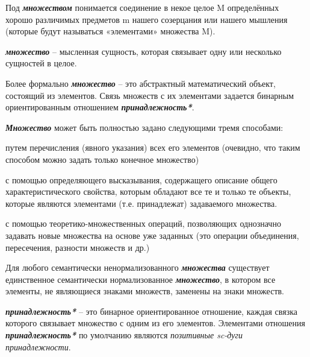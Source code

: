 Под \textbf{\textit{множеством}} понимается соединение в некое целое M определённых хорошо различимых предметов m нашего созерцания или нашего мышления (которые будут называться «элементами» множества M). 
	
\textbf{\textit{множество}} – мысленная сущность, которая связывает одну или несколько сущностей в целое.
	
Более формально \textbf{\textit{множество}} – это абстрактный математический объект, состоящий из элементов. Связь множеств с их элементами задается бинарным ориентированным отношением \textbf{\textit{принадлежность*}}.

\textbf{\textit{Множество}} может быть полностью задано следующими тремя способами:

\begin{textitemize}
		\item путем перечисления (явного указания) всех его элементов (очевидно, что таким способом можно задать только конечное множество)
		\item с помощью определяющего высказывания, содержащего описание общего характеристического свойства, которым обладают все те и только те объекты, которые являются элементами (т.е. принадлежат) задаваемого множества.
		\item с помощью теоретико-множественных операций, позволяющих однозначно задавать новые множества на основе уже заданных (это операции объединения, пересечения, разности множеств и др.)
\end{textitemize}

Для любого семантически ненормализованного \textbf{\textit{множества}} существует единственное семантически нормализованное \textbf{\textit{множество}}, в котором все элементы, не являющиеся знаками множеств, заменены на знаки множеств.

\begin{SCn}
\end{SCn}

\textbf{\textit{принадлежность*}} – это бинарное ориентированное отношение, каждая связка которого связывает множество с одним из его элементов. Элементами отношения \textbf{\textit{принадлежность*}} по умолчанию являются \textit{позитивные sc-дуги принадлежности}.


